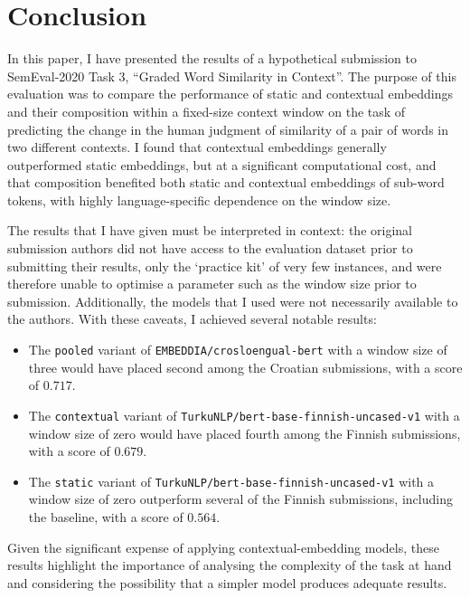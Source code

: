 \section{Conclusion}
\label{sec:conclusion}

In this paper, I have presented the results of a hypothetical submission to SemEval-2020
Task 3, ``Graded Word Similarity in Context''.
The purpose of this evaluation was to compare the performance of static and contextual
embeddings and their composition within a fixed-size context window on the task of
predicting the change in the human judgment of similarity of a pair of words in two
different contexts.
I found that contextual embeddings generally outperformed static embeddings, but at a
significant computational cost, and that composition benefited both static and
contextual embeddings of sub-word tokens, with highly language-specific dependence
on the window size.

The results that I have given must be interpreted in context: the original submission
authors did not have access to the evaluation dataset prior to submitting their results,
only the `practice kit' of very few instances, and were therefore unable to optimise a
parameter such as the window size prior to submission.
Additionally, the models that I used were not necessarily available to the authors.
With these caveats, I achieved several notable results:
\begin{itemize}
  \item The \texttt{pooled} variant of \texttt{EMBEDDIA/crosloengual-bert} with a window
        size of three would have placed second among the Croatian submissions, with a
        score of $0.717$.
  \item The \texttt{contextual} variant of \texttt{TurkuNLP/bert-base-finnish-uncased-v1}
        with a window size of zero would have placed fourth among the Finnish
        submissions, with a score of $0.679$.
  \item The \texttt{static} variant of \texttt{TurkuNLP/bert-base-finnish-uncased-v1}
        with a window size of zero outperform several of the Finnish submissions,
        including the baseline, with a score of $0.564$.
\end{itemize}
Given the significant expense of applying contextual-embedding models, these results
highlight the importance of analysing the complexity of the task at hand and considering
the possibility that a simpler model produces adequate results.